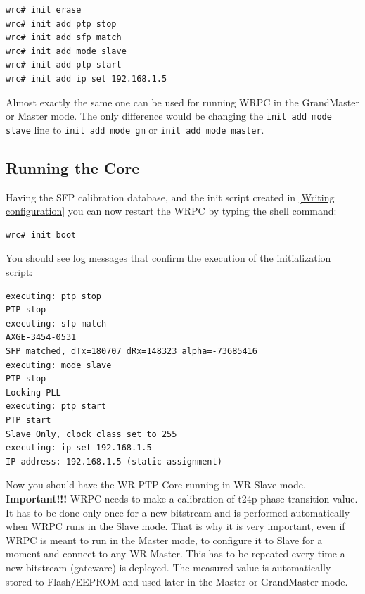 \documentclass[a4paper, 12pt]{article}
\begin{document}
\begin{lstlisting}
wrc# init erase
wrc# init add ptp stop
wrc# init add sfp match
wrc# init add mode slave
wrc# init add ptp start
wrc# init add ip set 192.168.1.5
\end{lstlisting}

Almost exactly the same one can be used for running WRPC in the GrandMaster
or Master mode. The only difference would be changing the
\texttt{init add mode slave} line to \texttt{init add mode gm} or
\texttt{init add mode master}.

\subsection{Running the Core}
\label{Running the Core}

Having the SFP calibration database, and the init script created in \ref{Writing
configuration} you can now restart the WRPC by typing the shell command:

\begin{lstlisting}
wrc# init boot
\end{lstlisting}

You should see log messages that confirm the execution of the initialization
script:

\begin{lstlisting}
executing: ptp stop
PTP stop
executing: sfp match
AXGE-3454-0531
SFP matched, dTx=180707 dRx=148323 alpha=-73685416
executing: mode slave
PTP stop
Locking PLL
executing: ptp start
PTP start
Slave Only, clock class set to 255
executing: ip set 192.168.1.5
IP-address: 192.168.1.5 (static assignment)
\end{lstlisting}

Now you should have the WR PTP Core running in WR Slave mode.\\

\textbf{Important!!!} WRPC needs to make a calibration of t24p phase transition
value. It has to be done only once for a new bitstream and is performed
automatically when WRPC runs in the Slave mode. That is why it is very
important, even if WRPC is meant to run in the Master mode, to configure it to
Slave for a moment and connect to any WR Master. This has to be repeated every
time a new bitstream (gateware) is deployed. The measured value is automatically
stored to Flash/EEPROM and used later in the Master or GrandMaster mode.\\
\end{document}
